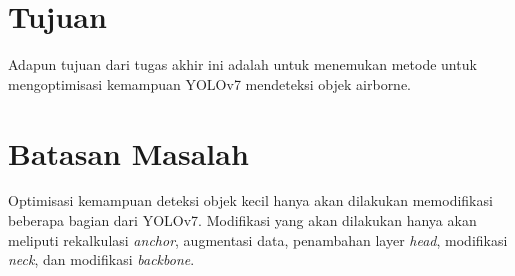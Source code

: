 \section{Tujuan}
    Adapun tujuan dari tugas akhir ini adalah untuk menemukan metode untuk mengoptimisasi kemampuan YOLOv7 mendeteksi objek airborne.

\section{Batasan Masalah}
    Optimisasi kemampuan deteksi objek kecil hanya akan dilakukan memodifikasi beberapa bagian dari YOLOv7.
    Modifikasi yang akan dilakukan hanya akan meliputi rekalkulasi \emph{anchor}, augmentasi data, penambahan layer \emph{head}, modifikasi \emph{neck}, dan modifikasi \emph{backbone}.